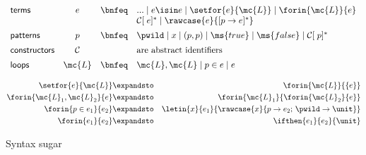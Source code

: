 \documentclass[preprint]{sigplanconf}
\renewcommand{\pipe}{\mathrel{\mid}} %
\begin{document}

\begin{figure}
  \[\begin{array}{lccl}
  \textsf{terms} &
  e &\bnfeq& ... \pipe e \isin e \pipe \setfor{e}{\mc{L}}
             \pipe \forin{\mc{L}}{e}\\
  &&& \mathcal{C}[\;e]^* \pipe \rawcase{e}{[{p} \to {e}]^*}
  \vspace{0.5em}\\

  \textsf{patterns} &
  p &\bnfeq& \pwild \pipe x \pipe (p,p)
             \pipe \ms{true} \pipe \ms{false} \pipe \mathcal{C}[\;p]^*
  \vspace{0.5em}\\
  \textsf{constructors} & \mathcal{C} && \text{are abstract identifiers}
  \vspace{0.5em}\\
  \textsf{loops} &
  \mc{L} &\bnfeq& \mc{L}, \mc{L} \pipe p \in e \pipe e
  \end{array}\]

  \begin{eqnarray*}
    \setfor{e}{\mc{L}}       &\expandsto& \forin{\mc{L}}{\{e\}}\\
    \forin{\mc{L}_1,\mc{L}_2}{e}
    &\expandsto& \forin{\mc{L}_1}{\forin{\mc{L}_2}{e}}\\
    \forin{p\in e_1}{e_2}
    &\expandsto& \letin{x}{e_1}{\rawcase{x}{p \to e_2;\,\pwild \to \unit}}\\
    \forin{e_1}{e_2} &\expandsto& \ifthen{e_1}{e_2}{\unit}
  \end{eqnarray*}
  \caption{Syntax sugar}
  \label{fig:sugar}
\end{figure}
\end{document}
